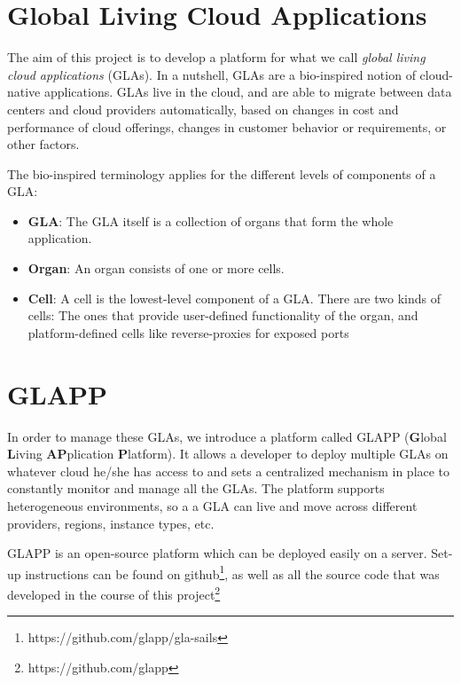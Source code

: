 \documentclass{seal_thesis}
\begin{document}
\section{Global Living Cloud Applications}

The aim of this project is to develop a platform for what we call \textit{global living cloud applications} (GLAs).
In a nutshell, GLAs are a bio-inspired notion of cloud-native applications.
GLAs live in the cloud, and are able to migrate between data centers and cloud providers automatically, based on changes in cost and performance of cloud offerings, changes in customer behavior or requirements, or other factors.

The bio-inspired terminology applies for the different levels of components of a GLA:

\begin{itemize}
	\item \textbf{GLA}: The GLA itself is a collection of organs that form the whole application.
	\item \textbf{Organ}: An organ consists of one or more cells.
	\item \textbf{Cell}: A cell is the lowest-level component of a GLA.
	There are two kinds of cells: The ones that provide user-defined functionality of the organ, and platform-defined cells like reverse-proxies for exposed ports
\end{itemize}


\section{GLAPP}

In order to manage these GLAs, we introduce a platform called GLAPP (\textbf{G}lobal \textbf{L}iving \textbf{AP}plication \textbf{P}latform).
It allows a developer to deploy multiple GLAs on whatever cloud he/she has access to and sets a centralized mechanism in place to constantly monitor and manage all the GLAs.
The platform supports heterogeneous environments, so a a GLA can live and move across different providers, regions, instance types, etc.

GLAPP is an open-source platform which can be deployed easily on a server. Set-up instructions can be found on github\footnote{https://github.com/glapp/gla-sails}, as well as all the source code that was developed in the course of this project\footnote{https://github.com/glapp}
\end{document}
